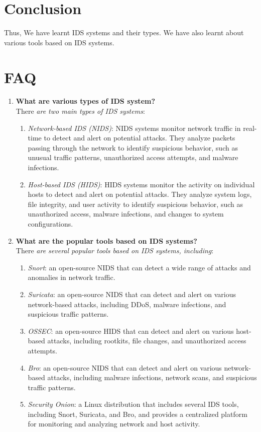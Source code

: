 \documentclass[openany]{book}
\begin{document}
\section{Conclusion}
Thus, We have learnt IDS systems and their types. We have also learnt about various tools based on IDS systems.
\clearpage

\section{FAQ}

\begin{enumerate}
    \item \textbf{What are various types of IDS system?}\\

          There \textit{are two main types of IDS systems}:
          \begin{enumerate}
              \item \textit{Network-based IDS (NIDS)}: NIDS systems monitor network traffic in real-time to detect and alert on potential attacks. They analyze packets passing through the network to identify suspicious behavior, such as unusual traffic patterns, unauthorized access attempts, and malware infections.
              \item \textit{Host-based IDS (HIDS)}: HIDS systems monitor the activity on individual hosts to detect and alert on potential attacks. They analyze system logs, file integrity, and user activity to identify suspicious behavior, such as unauthorized access, malware infections, and changes to system configurations.
          \end{enumerate}

    \item \textbf{What are the popular tools based on IDS systems?}\\

          There \textit{are several popular tools based on IDS systems, including}:

          \begin{enumerate}
              \item \textit{Snort}: an open-source NIDS that can detect a wide range of attacks and anomalies in network traffic.
              \item \textit{Suricata}: an open-source NIDS that can detect and alert on various network-based attacks, including DDoS, malware infections, and suspicious traffic patterns.
              \item \textit{OSSEC}: an open-source HIDS that can detect and alert on various host-based attacks, including rootkits, file changes, and unauthorized access attempts.
              \item \textit{Bro}: an open-source NIDS that can detect and alert on various network-based attacks, including malware infections, network scans, and suspicious traffic patterns.
              \item \textit{Security Onion}: a Linux distribution that includes several IDS tools, including Snort, Suricata, and Bro, and provides a centralized platform for monitoring and analyzing network and host activity.
          \end{enumerate}


\end{enumerate}
\end{document}
